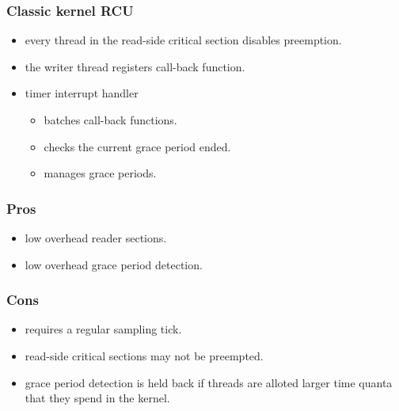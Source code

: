 \documentclass{beamer}
\begin{document}

\begin{frame}[t]
  \frametitle{Classic kernel RCU}

  \begin{itemize}
  \item every thread in the read-side critical section disables preemption.
  \item the writer thread registers call-back function.
  \item timer interrupt handler
    \begin{itemize}
    \item batches call-back functions.
    \item checks the current grace period ended.
    \item manages grace periods.
    \end{itemize}
  \end{itemize}
  
\end{frame}


\begin{frame}[t]
  \frametitle{Pros}
  
  \begin{itemize}
  \item low overhead reader sections.
  \item low overhead grace period detection.
  \end{itemize}

\end{frame}


\begin{frame}[t]
  \frametitle{Cons}

  \begin{itemize}
  \item requires a regular sampling tick.
  \item read-side critical sections may not be preempted.
  \item grace period detection is held back if threads are alloted larger time quanta
    that they spend in the kernel.
  \end{itemize}
  
\end{frame}
\end{document}
